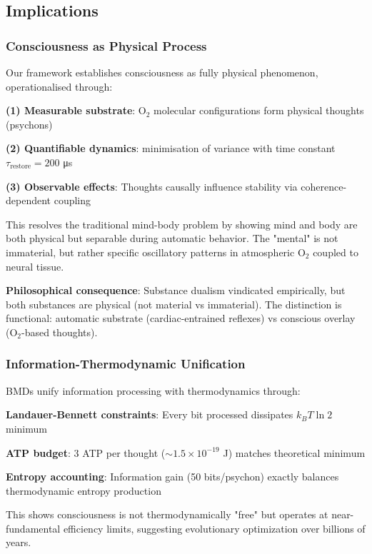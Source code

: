 \documentclass[11pt,onecolumn]{article}
\begin{document}
\subsection{Implications}

\subsubsection{Consciousness as Physical Process}

Our framework establishes consciousness as fully physical phenomenon, operationalised through:

\textbf{(1) Measurable substrate}: O$_2$ molecular configurations form physical thoughts (psychons)

\textbf{(2) Quantifiable dynamics}: minimisation of variance with time constant $\tau_{\text{restore}} = 200$ μs

\textbf{(3) Observable effects}: Thoughts causally influence stability via coherence-dependent coupling

This resolves the traditional mind-body problem by showing mind and body are both physical but separable during automatic behavior. The "mental" is not immaterial, but rather specific oscillatory patterns in atmospheric O$_2$ coupled to neural tissue.

\textbf{Philosophical consequence}: Substance dualism vindicated empirically, but both substances are physical (not material vs immaterial). The distinction is functional: automatic substrate (cardiac-entrained reflexes) vs conscious overlay (O$_2$-based thoughts).

\subsubsection{Information-Thermodynamic Unification}

BMDs unify information processing with thermodynamics through:

\textbf{Landauer-Bennett constraints}: Every bit processed dissipates $k_B T \ln 2$ minimum

\textbf{ATP budget}: 3 ATP per thought ($\sim 1.5 \times 10^{-19}$ J) matches theoretical minimum

\textbf{Entropy accounting}: Information gain (50 bits/psychon) exactly balances thermodynamic entropy production

This shows consciousness is not thermodynamically "free" but operates at near-fundamental efficiency limits, suggesting evolutionary optimization over billions of years.
\end{document}
